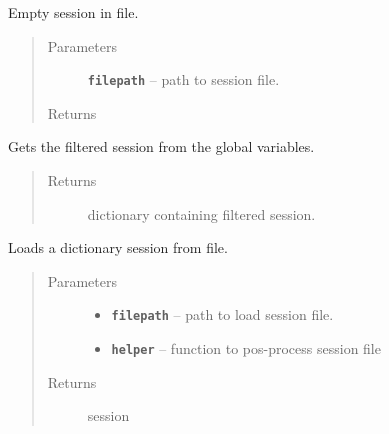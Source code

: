 \documentclass[letterpaper,10pt,english]{sphinxmanual}
\begin{document}

\begin{fulllineitems}
\label{RRtoolbox.lib:RRtoolbox.lib.session.flushSession}
Empty session in file.
\begin{quote}\begin{description}
\item[{Parameters}] \leavevmode
\textbf{\texttt{filepath}} -- path to session file.

\item[{Returns}] \leavevmode


\end{description}\end{quote}

\end{fulllineitems}


\begin{fulllineitems}
\label{RRtoolbox.lib:RRtoolbox.lib.session.getEnviromentSession}
Gets the filtered session from the global variables.
\begin{quote}\begin{description}
\item[{Returns}] \leavevmode
dictionary containing filtered session.

\end{description}\end{quote}

\end{fulllineitems}


\begin{fulllineitems}
\label{RRtoolbox.lib:RRtoolbox.lib.session.readSession}
Loads a dictionary session from file.
\begin{quote}\begin{description}
\item[{Parameters}] \leavevmode\begin{itemize}
\item {} 
\textbf{\texttt{filepath}} -- path to load session file.

\item {} 
\textbf{\texttt{helper}} -- function to pos-process session file

\end{itemize}

\item[{Returns}] \leavevmode
session

\end{description}\end{quote}

\end{fulllineitems}
\end{document}

